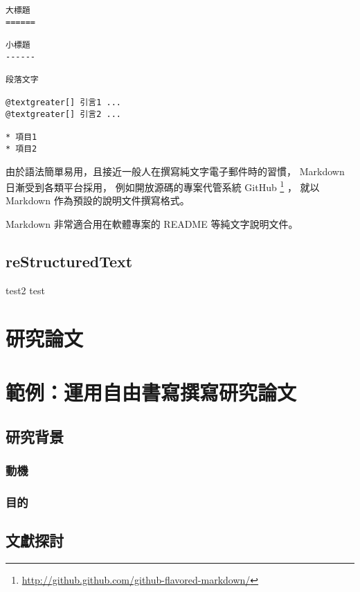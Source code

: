 \documentclass[a4paper,12pt,english]{sphinxmanual}
\begin{document}
\begin{Verbatim}[commandchars=@\[\]]
大標題
======

小標題
------

段落文字

@textgreater[] 引言1 ...
@textgreater[] 引言2 ...

* 項目1
* 項目2
\end{Verbatim}

由於語法簡單易用，且接近一般人在撰寫純文字電子郵件時的習慣，
Markdown 日漸受到各類平台採用，
例如開放源碼的專案代管系統 GitHub \footnote{
\href{http://github.github.com/github-flavored-markdown/}{http://github.github.com/github-flavored-markdown/}
} ，
就以 Markdown 作為預設的說明文件撰寫格式。

Markdown 非常適合用在軟體專案的 README 等純文字說明文件。


\section{reStructuredText}
\label{syntax:restructuredtext}
test2
test


\chapter{研究論文}
\label{thesis::doc}\label{thesis:id1}

\chapter{範例：運用自由書寫撰寫研究論文}
\label{thesis:id2}

\section{研究背景}
\label{thesis:id3}

\subsection{動機}
\label{thesis:id4}

\subsection{目的}
\label{thesis:id5}

\section{文獻探討}
\label{thesis:id6}
\end{document}
